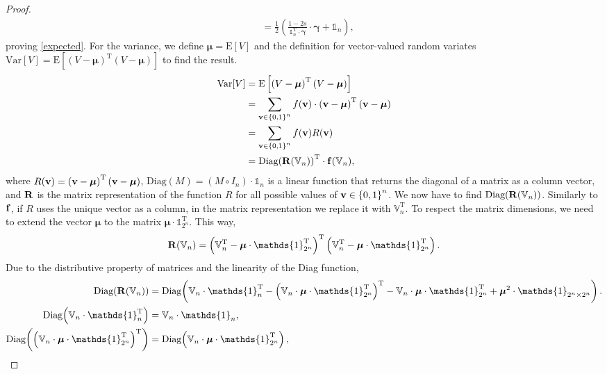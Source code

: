 \documentclass{article}
\newcommand{\0}{\mathbbold{0}}
\newcommand{\1}{\mathds{1}}
\newcommand{\2}{\mathbbold{2}}
\newcommand{\V}{\mathbb{V}}
\newcommand{\T}{^{\operatorname{T}}}
\newcommand{\Diag}[1]{\text{Diag}\!\left(#1\right)}
\begin{document}
\begin{proof}
\begin{align*}
        &= \frac{1}{2}\left(\frac{1-2s}{\1_n\T\cdot {\boldsymbol \gamma}}\cdot {\boldsymbol \gamma} + \1_n\right),
    \end{align*}
    proving \eqref{expected}. For the variance, we define ${\boldsymbol \mu} = \text{E}[V]$ and the definition for vector-valued random variates $\text{Var}[V] = \text{E}\left[\left(V-{\boldsymbol \mu}\right)\T\left(V-{\boldsymbol \mu}\right)\right]$ to find the result.
    \begin{align*}
        \text{Var}[V] &= \text{E}\left[\left(V-{\boldsymbol \mu}\right)\T\left(V-{\boldsymbol \mu}\right)\right] \\
        &= \sum_{{\bf v} \in \left\{0,1\right\}^n} f({\bf v}) \cdot \left({\bf v}-{\boldsymbol \mu}\right)\T\left({\bf v}-{\boldsymbol \mu}\right) \\
        &= \sum_{{\bf v} \in \left\{0,1\right\}^n} f({\bf v}) R({\bf v}) \\
        &= \Diag{{\bf R}(\V_n)}\T \cdot {\bf f}(\V_n),
    \end{align*}
    where $ R({\bf v}) = \left({\bf v}-{\boldsymbol \mu}\right)\T\left({\bf v}-{\boldsymbol \mu}\right) $, $\Diag{M} = (M \circ I_n)\cdot\1_n$ is a linear function that returns the diagonal of a matrix as a column vector, and ${\bf R}$ is the matrix representation of the function $R$ for all possible values of ${\bf v} \in \left\{0,1\right\}^n$.
    We now have to find $\Diag{{\bf R}(\V_n)}$. Similarly to ${\bf f}$, if $R$ uses the unique vector as a column, in the matrix representation we replace it with $\V_n\T$. To respect the matrix dimensions, we need to extend the vector ${\boldsymbol \mu}$ to the matrix ${\boldsymbol \mu}\cdot\1_{2^n}\T$. This way,
    \begin{equation*}
        {\bf R}(\V_n) = \left(\V_n\T - {\boldsymbol \mu}\cdot\1_{2^n}\T\right)\T\left(\V_n\T - {\boldsymbol \mu}\cdot\1_{2^n}\T\right).
    \end{equation*}
    Due to the distributive property of matrices and the linearity of the Diag function,
    \begin{align*}
        \Diag{{\bf R}(\V_n)} &= \Diag{\V_n\cdot\1_n\T - \left(\V_n\cdot{\boldsymbol \mu}\cdot\1_{2^n}\T\right)\T - \V_n\cdot{\boldsymbol \mu}\cdot\1_{2^n}\T + {\boldsymbol \mu}^2\cdot\1_{2^n \times 2^n}}. \\
        \Diag{\V_n\cdot\1_n\T} &= \V_n\cdot\1_n, \\
        \Diag{\left(\V_n\cdot{\boldsymbol \mu}\cdot\1_{2^n}\T\right)\T } &= \Diag{\V_n\cdot{\boldsymbol \mu}\cdot\1_{2^n}\T}, \\

\end{align*}
\end{proof}
\end{document}
